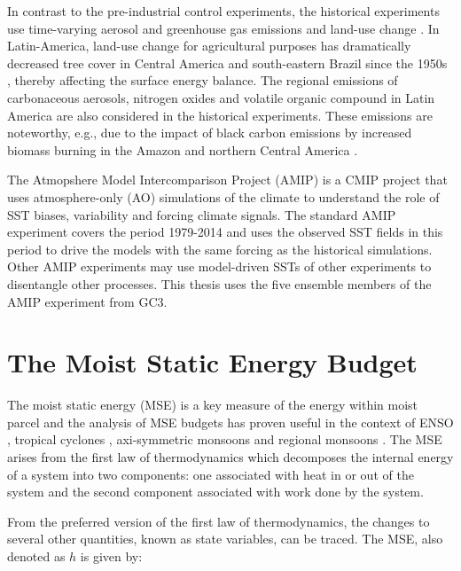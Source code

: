 In contrast to the pre-industrial control experiments, the historical experiments use  time-varying aerosol and greenhouse gas emissions and land-use change \citep{eyring2016}. In Latin-America, land-use change for agricultural purposes has dramatically decreased tree cover in Central America and south-eastern Brazil since the 1950s \citep{lawrence2012}, thereby affecting the surface energy balance. %
The regional emissions of carbonaceous aerosols, nitrogen oxides and volatile organic compound in Latin America are also considered in the historical experiments. These emissions are noteworthy, e.g., due to the impact of black carbon emissions by increased biomass burning in the Amazon and northern Central America \citep{chuvieco2008}.  


The Atmopshere Model Intercomparison Project (AMIP) is a CMIP project that uses atmosphere-only (AO) simulations of the climate to understand the role of SST biases, variability and forcing climate signals. The standard AMIP experiment covers the period 1979-2014 and uses the observed SST fields in this period to drive the models with the same forcing as the historical simulations. Other AMIP experiments may use model-driven SSTs of other experiments to disentangle other processes.  This thesis uses the five ensemble members of the AMIP experiment from GC3. 

\section{The Moist Static Energy Budget}\label{sq:msemethod}

The moist static energy (MSE) is a key measure of the energy within moist parcel and the analysis of MSE budgets has proven useful in the context of ENSO \citep[e.g.][]{annamalai2020}, tropical cyclones \citep[e.g.][]{wing2019}, axi-symmetric monsoons \citep[e.g.][]{bordoni2008monsoons} and regional monsoons \citep[e.g.][]{smyth2018simulated,ma2019}. The MSE arises from the first law of thermodynamics which decomposes the internal energy of a system into two components: one associated with heat in or out of the system and the second component associated with work done by the system. 

From the preferred version of the first law of thermodynamics, the changes to several other quantities, known as state variables, can be traced. 
The MSE, also denoted as $h$ is given by:

